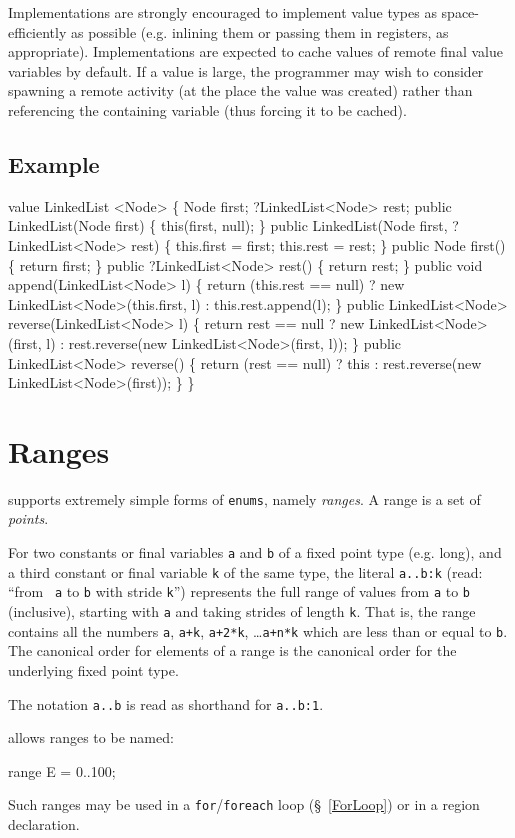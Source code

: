 Implementations are strongly encouraged to implement value types as
space-efficiently as possible (e.g.{} inlining them or passing them in
registers, as appropriate).  Implementations are expected to cache
values of remote final value variables by default. If a value is
large, the programmer may wish to consider spawning a remote activity
(at the place the value was created) rather than referencing the
containing variable (thus forcing it to be cached).


\subsection{Example}
\begin{x10}
 value LinkedList <Node> \{ 
  Node first;
  ?LinkedList<Node> rest;
  public
     LinkedList(Node first) \{
     this(first, null);
  \}
  public
    LinkedList(Node first, ?LinkedList<Node> rest) \{
    this.first = first;
    this.rest = rest;
  \}
  public 
    Node first() \{
    return first;
  \}
  public 
    ?LinkedList<Node> rest() \{
    return rest;
  \} 
  public
    void append(LinkedList<Node> l) \{
    return (this.rest == null) 
        ? new LinkedList<Node>(this.first, l) 
        : this.rest.append(l);
  \}
  public 
    LinkedList<Node> reverse(LinkedList<Node> l) \{ 
    return 
      rest == null 
      ? new LinkedList<Node>(first, l)  
      : rest.reverse(new LinkedList<Node>(first, l));
   \}
  public
    LinkedList<Node> reverse() \{
    return (rest == null) 
        ? this 
        : rest.reverse(new LinkedList<Node>(first));
  \}
\}
\end{x10}

\section{Ranges}\label{XtenRanges}

\XtenCurrVer{} supports extremely simple forms of {\tt enums}, namely {\em ranges}. A range is a set of {\em points}.

For two constants or final variables {\tt a} and {\tt b} of a fixed
point type (e.g.{} {\cf long}), and a third constant or final variable
{\tt k} of the same type, the literal {\tt a..b:k} (read: ``from {\tt
a} to {\tt b} with stride {\tt k}'') represents the full range of
values from {\tt a} to {\tt b} (inclusive), starting with {\tt a} and
taking strides of length {\tt k}. That is, the range contains all the
numbers {\tt a}, {\tt a+k}, {\tt a+2*k}, \ldots {\tt a+n*k} which are
less than or equal to {\tt b}. The canonical order for elements of a
range is the canonical order for the underlying fixed point type.

The notation {\tt a..b} is read as shorthand for {\tt a..b:1}.

\Xten{} allows ranges to be named:
\begin{x10}
   range   E = 0..100;
\end{x10}

Such ranges may be used in a {\tt for}/{\tt foreach} loop
(\S~\ref{ForLoop}) or in a region declaration.






